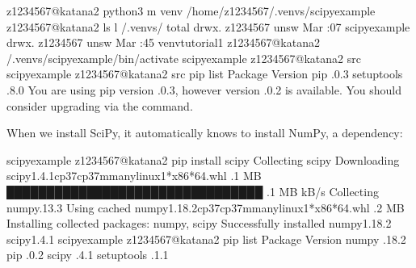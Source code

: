 \documentclass[letterpaper,10pt,english]{sphinxmanual}
\begin{document}
\begin{sphinxVerbatim}[commandchars=\\\{\}]
\PYG{o}{[}z1234567@katana2 \PYGZti{}\PYG{o}{]}\PYGZdl{} python3 \PYGZhy{}m venv /home/z1234567/.venvs/scipy\PYGZhy{}example
\PYG{o}{[}z1234567@katana2 \PYGZti{}\PYG{o}{]}\PYGZdl{} ls \PYGZhy{}l \PYGZti{}/.venvs/
total 
drwx\PYGZhy{}\PYGZhy{}\PYGZhy{}\PYGZhy{}\PYGZhy{}\PYGZhy{}.  z1234567 unsw  Mar  :07 scipy\PYGZhy{}example
drwx\PYGZhy{}\PYGZhy{}\PYGZhy{}\PYGZhy{}\PYGZhy{}\PYGZhy{}.  z1234567 unsw  Mar  :45 venv\PYGZhy{}tutorial\PYGZhy{}1
\PYG{o}{[}z1234567@katana2 \PYGZti{}\PYG{o}{]}\PYGZdl{}  \PYGZti{}/.venvs/scipy\PYGZhy{}example/bin/activate
scipy\PYGZhy{}example \PYG{o}{[}z1234567@katana2 src\PYG{o}{]}\PYGZdl{}
scipy\PYGZhy{}example \PYG{o}{[}z1234567@katana2 src\PYG{o}{]}\PYGZdl{} pip list
Package    Version
\PYGZhy{}\PYGZhy{}\PYGZhy{}\PYGZhy{}\PYGZhy{}\PYGZhy{}\PYGZhy{}\PYGZhy{}\PYGZhy{}\PYGZhy{} \PYGZhy{}\PYGZhy{}\PYGZhy{}\PYGZhy{}\PYGZhy{}\PYGZhy{}\PYGZhy{}
pip        .0.3
setuptools .8.0
You are using pip version .0.3, however version .0.2 is available.
You should consider upgrading via the  command.
\end{sphinxVerbatim}

When we install SciPy, it automatically knows to install NumPy, a dependency:

\begin{sphinxVerbatim}[commandchars=\\\{\}]
scipy\PYGZhy{}example \PYG{o}{[}z1234567@katana2 \PYGZti{}\PYG{o}{]}\PYGZdl{} pip install scipy
Collecting scipy
  Downloading scipy\PYGZhy{}1.4.1\PYGZhy{}cp37\PYGZhy{}cp37m\PYGZhy{}manylinux1*x86*64.whl .1 MB
     ████████████████████████████████ .1 MB  kB/s
Collecting numpy\PYGZgt{}.13.3
  Using cached numpy\PYGZhy{}1.18.2\PYGZhy{}cp37\PYGZhy{}cp37m\PYGZhy{}manylinux1*x86*64.whl .2 MB
Installing collected packages: numpy, scipy
Successfully installed numpy\PYGZhy{}1.18.2 scipy\PYGZhy{}1.4.1
scipy\PYGZhy{}example \PYG{o}{[}z1234567@katana2 \PYGZti{}\PYG{o}{]}\PYGZdl{} pip list
Package    Version
\PYGZhy{}\PYGZhy{}\PYGZhy{}\PYGZhy{}\PYGZhy{}\PYGZhy{}\PYGZhy{}\PYGZhy{}\PYGZhy{}\PYGZhy{} \PYGZhy{}\PYGZhy{}\PYGZhy{}\PYGZhy{}\PYGZhy{}\PYGZhy{}\PYGZhy{}
numpy      .18.2
pip        .0.2
scipy      .4.1
setuptools .1.1
\end{sphinxVerbatim}
\end{document}
